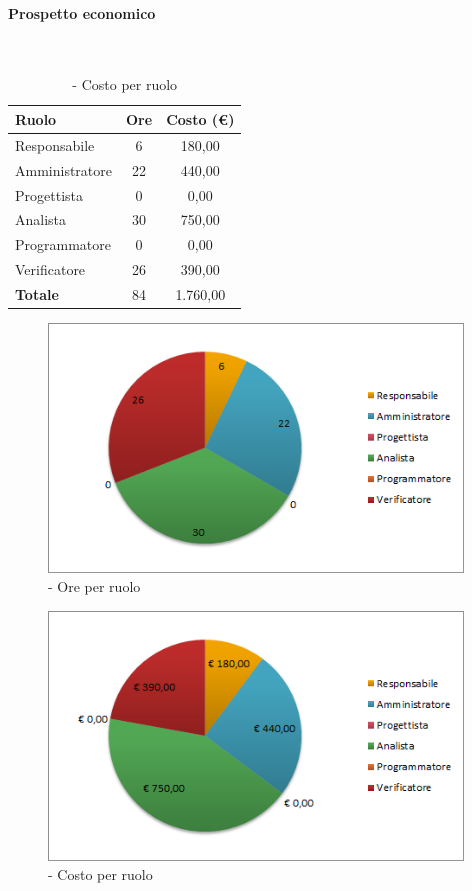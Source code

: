 \documentclass[./PianoDiProgetto.tex]{subfiles}
\begin{document}
\vspace{35 mm}

	\paragraph{Prospetto economico}\

					\begin{table}[H]
		\centering

		\begin{tabular}{l * {2}{c}}
			\toprule
			\textbf{Ruolo} & \textbf{Ore} & \textbf{Costo (\euro{})} \\
			\midrule
			Responsabile &	6 & 180,00 \\
			Amministratore & 22 & 440,00 \\
			Progettista & 0 & 0,00 \\
			Analista & 30 & 750,00 \\
			Programmatore & 0 & 0,00 \\
			Verificatore & 26 & 390,00 \\
			\midrule
			\textbf{Totale} & 84 & 1.760,00 \\
			\bottomrule
		\end{tabular}
		\caption{\PerAD{} - Costo per ruolo}
	\end{table}
\vfill
\newpage

	\begin{figure}[H]
		\centering
		\includegraphics[width=11cm, trim=1cm 0cm 1cm 0cm]{grafici/Ad-ruolo}
			\caption{\PerAD{} - Ore per ruolo}
	\end{figure}
\vfill
	\begin{figure}[H]
		\centering
		\includegraphics[width=11cm, trim=1cm 0cm 1cm 0cm]{grafici/Ad-costo}
			\caption{\PerAD{} - Costo per ruolo}
	\end{figure}
\vfill
\newpage
\end{document}
